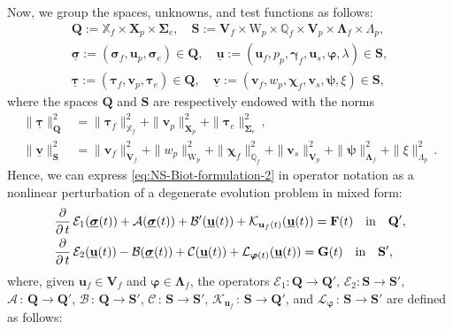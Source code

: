 \documentclass[11pt]{article}
\numberwithin{equation}{section}
\newcommand{\ds}{\displaystyle}
\newcommand{\bgamma}{{\boldsymbol\gamma}}
\newcommand{\bLambda}{{\boldsymbol\Lambda}}
\newcommand{\bsi}{{\boldsymbol\sigma}}
\newcommand{\bSigma}{{\boldsymbol\Sigma}}
\newcommand{\bvarphi}{{\boldsymbol\varphi}}
\newcommand{\bpsi}{{\boldsymbol\psi}}
\newcommand{\btau}{{\boldsymbol\tau}}
\newcommand{\bchi}{{\boldsymbol\chi}}
\newcommand{\ubsi}{\underline{\bsi}}
\newcommand{\ubtau}{\underline{\btau}}
\newcommand{\ubu}{\underline{\bu}}
\newcommand{\ubv}{\underline{\bv}}
\newcommand{\bv}{{\mathbf{v}}}
\newcommand{\bu}{\mathbf{u}}
\newcommand{\0}{{\mathbf{0}}}
\def\bF{\mathbf{F}}
\def\bG{\mathbf{G}}
\def\bX{\mathbf{X}}
\def\bV{\mathbf{V}}
\def\bQ{\mathbf{Q}}
\def\bS{\mathbf{S}}
\newcommand\bbQ{\mathbb{Q}}
\newcommand\bbX{\mathbb{X}}
\newcommand{\cA}{\mathcal{A}}
\newcommand{\cB}{\mathcal{B}}
\newcommand{\cC}{\mathcal{C}}
\newcommand{\cE}{\mathcal{E}}
\newcommand{\cK}{\mathcal{K}}
\newcommand{\cL}{\mathcal{L}}
\def\W{\mathrm{W}}
\def\qin{{\quad\hbox{in}\quad}}
\numberwithin{equation}{section}
\begin{document}
Now, we group the spaces, unknowns, and test functions as follows:
\begin{equation*}
\begin{array}{c}
\ds \bQ := \bbX_f\times \bX_p\times \bSigma_e,\quad
\bS := \bV_f\times \W_p\times \bbQ_f\times \bV_p\times \bLambda_f\times \Lambda_p, \\ [1.5ex]
\ds \ubsi := (\bsi_f, \bu_p, \bsi_e)\in \bQ,\quad 
\ubu := (\bu_f, p_p, \bgamma_f, \bu_s, \bvarphi, \lambda)\in \bS, \\[1ex]
\ds \ubtau := (\btau_f, \bv_p, \btau_e)\in \bQ,\quad 
\ubv := (\bv_f, w_p, \bchi_f, \bv_s, \bpsi, \xi)\in \bS,
\end{array}
\end{equation*}
where the spaces $\bQ$ and $\bS$ are respectively endowed with the norms
\begin{align*}
\|\ubtau\|^2_{\bQ} & = \|\btau_f\|^2_{\bbX_f} + \|\bv_p\|^2_{\bX_p} + \|\btau_e\|^2_{\bSigma_e}\,, \\[1ex]
\|\ubv\|^2_{\bS} & = \|\bv_f\|^2_{\bV_f} + \|w_p\|^2_{\W_p} + \|\bchi_f\|^2_{\bbQ_f} + \|\bv_s\|^2_{\bV_p} + \|\bpsi\|^2_{\bLambda_f} + \|\xi\|^2_{\Lambda_p}\,.
\end{align*}
Hence, we can express \eqref{eq:NS-Biot-formulation-2} in operator notation as a nonlinear perturbation of a degenerate evolution problem in mixed form:
%
\begin{align}
& \frac{\partial}{\partial\,t}\,\cE_1(\ubsi(t)) + \cA(\ubsi(t)) + \cB'(\ubu(t)) + \cK_{\bu_f(t)}(\ubu(t))  =  \bF(t) \qin \bQ', \nonumber\\ 
& \frac{\partial}{\partial\,t}\,\cE_2(\ubu(t)) - \cB(\ubsi(t)) + \cC(\ubu(t))+\cL_{\bvarphi(t)}(\ubu(t))  =  \bG(t) \qin \bS',\label{eq:alternative-formulation-operator-form}
\end{align}
where, given $\bu_f\in \bV_f$ and $\bvarphi \in \bLambda_f$, the operators
$\cE_1 : \bQ\to \bQ'$, $\cE_2 : \bS\to \bS'$, 
$\cA\,:\,\bQ\to \bQ'$, $\cB\,:\, \bQ\to \bS'$, $\cC\,:\,\bS\to \bS'$,  $\cK_{\bu_f}\,:\,\bS\to \bQ'$, and $\cL_{\bvarphi}\,:\,\bS\to \bS'$ are defined as follows:
\end{document}
